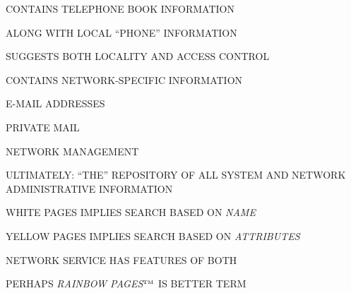 \begin{bwslide}

\begin{nrtc}
\item	CONTAINS TELEPHONE BOOK INFORMATION
    \begin{nrtc}
    \item	ALONG WITH LOCAL ``PHONE'' INFORMATION

    \item	SUGGESTS BOTH LOCALITY AND ACCESS CONTROL
    \end{nrtc}

\item	CONTAINS NETWORK-SPECIFIC INFORMATION
    \begin{nrtc}
    \item	E-MAIL ADDRESSES

    \item	PRIVATE MAIL

    \item	NETWORK MANAGEMENT
    \end{nrtc}

\item	ULTIMATELY: ``THE'' REPOSITORY OF ALL SYSTEM AND
	NETWORK ADMINISTRATIVE INFORMATION
\end{nrtc}
\end{bwslide}


\begin{bwslide}

\begin{nrtc}
\item	WHITE PAGES IMPLIES SEARCH BASED ON \emph{NAME}

\item	YELLOW PAGES IMPLIES SEARCH BASED ON \emph{ATTRIBUTES}

\item	NETWORK SERVICE HAS FEATURES OF BOTH
    \begin{nrtc}
    \item	PERHAPS \emph{RAINBOW PAGES}$^{\hbox{\tiny TM}}$ IS BETTER TERM
    \end{nrtc}
\end{nrtc}
\end{bwslide}


